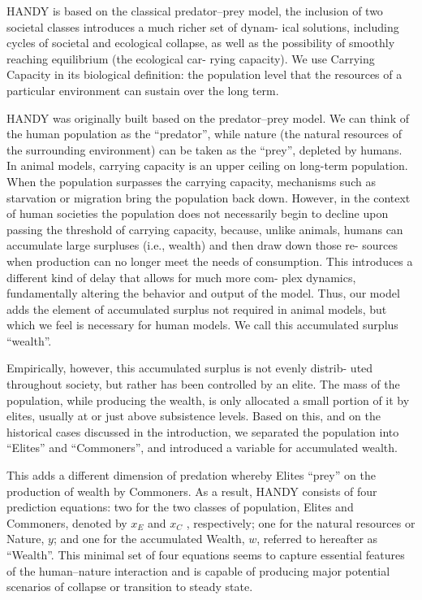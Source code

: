 \documentclass[
]{book}
\begin{document}
HANDY is based on the classical predator--prey model, the
inclusion of two societal classes introduces a much richer set of dynam-
ical solutions, including cycles of societal and ecological collapse, as well
as the possibility of smoothly reaching equilibrium (the ecological car-
rying capacity). We use Carrying Capacity in its biological definition:
the population level that the resources of a particular environment
can sustain over the long term.

HANDY was
originally built based on the predator--prey model. We can think of
the human population as the ``predator'', while nature (the natural
resources of the surrounding environment) can be taken as the ``prey'',
depleted by humans. In animal models, carrying capacity is an upper
ceiling on long-term population. When the population surpasses the
carrying capacity, mechanisms such as starvation or migration bring
the population back down. However, in the context of human societies
the population does not necessarily begin to decline upon passing the
threshold of carrying capacity, because, unlike animals, humans can
accumulate large surpluses (i.e., wealth) and then draw down those re-
sources when production can no longer meet the needs of consumption.
This introduces a different kind of delay that allows for much more com-
plex dynamics, fundamentally altering the behavior and output of the
model. Thus, our model adds the element of accumulated surplus not
required in animal models, but which we feel is necessary for human
models. We call this accumulated surplus ``wealth''.

Empirically, however, this accumulated surplus is not evenly distrib-
uted throughout society, but rather has been controlled by an elite. The
mass of the population, while producing the wealth, is only allocated a
small portion of it by elites, usually at or just above subsistence levels.
Based on this, and on the historical cases discussed in the introduction,
we separated the population into ``Elites'' and ``Commoners'', and introduced
a variable for accumulated wealth.

This adds a different dimension of predation whereby
Elites ``prey'' on the production of wealth
by Commoners. As a result, HANDY consists of four prediction equations:
two for the two classes of population, Elites and Commoners,
denoted by \(x_E\) and \(x_C\) , respectively; one for the natural resources or
Nature, \(y\); and one for the accumulated Wealth, \(w\), referred to hereafter
as ``Wealth''. This minimal set of four equations seems to capture essential
features of the human--nature interaction and is capable of producing
major potential scenarios of collapse or transition to steady state.
\end{document}
